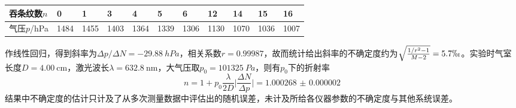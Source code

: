 \documentclass[UTF8]{ctexart}
\begin{document}
\noindent
\begin{tabu} to \linewidth {X[1.5]|X X X X X X X X X X}
\hline
吞条纹数$n$&0 &1 &3 &4 &5 &6 &12 &14 &15 &16\\
\hline
气压$p$/hPa&1484 &1455 &1403 &1364 &1339 &1306 &1130 &1070 &1036 &1007\\
\hline
\end{tabu}

作线性回归，得到斜率为$\Delta p/\Delta N=\SI{-29.88}{hPa}$，相关系数$r=0.99987$，故而统计给出斜率的不确定度约为$\sqrt{\frac{1/r^2-1}{M-2}}=5.7\permil$。实验时气室长度$D=\SI{4.00}{\cm}$，激光波长$\lambda=\SI{632.8}{\nm}$，大气压取$p_0=\SI{101325}{Pa}$，则有$p_0$下的折射率
\begin{equation}
  n=1+p_0\frac{\lambda}{2D}\lvert\frac{\Delta N}{\Delta p}\rvert=\num{1.000268(2)}
\end{equation}
结果中不确定度的估计只计及了从多次测量数据中评估出的随机误差，未计及所给各仪器参数的不确定度与其他系统误差。
\end{document}
